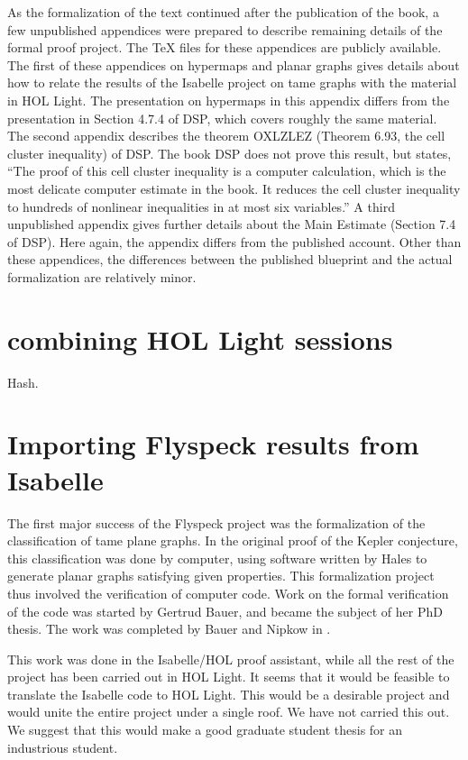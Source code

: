 As the formalization of the text continued after the publication of the book, a few unpublished appendices were prepared
to describe remaining details of the formal proof project.  The TeX files for these appendices are publicly available.
The first of these appendices on hypermaps and planar graphs
gives details about how to relate the results of the Isabelle project on tame graphs with the material in HOL Light.
The presentation on hypermaps in this appendix differs from the presentation in Section 4.7.4 of DSP, which covers
roughly the same material.  
The second appendix describes the theorem OXLZLEZ (Theorem 6.93, the cell cluster inequality) of DSP.   The book DSP
does not prove this result, but states, ``The proof of this cell cluster inequality is a computer calculation, which is the most
delicate computer estimate in the book.  It reduces the cell cluster inequality to hundreds of nonlinear inequalities in at most
six variables.''    A third unpublished appendix gives further details about the Main Estimate (Section 7.4 of DSP).  Here again,
the appendix differs from the published account.  Other than these appendices, the differences between the published blueprint
and the actual formalization are relatively minor.




\section{combining HOL Light sessions}

Hash.


\section{Importing Flyspeck results from Isabelle}

The first major success of the Flyspeck project was the formalization of the classification of tame plane graphs.
In the original proof of the Kepler conjecture, this classification was done by computer, using software written by Hales
to generate planar graphs satisfying given properties.   This formalization project
thus involved the verification of computer code.  Work on the formal verification of the code was started by Gertrud Bauer,
and became the subject of her PhD thesis.  The work was completed by Bauer and Nipkow in \cite{XX}.

This work was done in the Isabelle/HOL proof assistant, while all the rest of the project has been carried out in HOL Light.
It seems that it would be feasible to translate the Isabelle code to HOL Light.  This would be a desirable project and would
unite the entire project under a single roof.  We have not carried this out.   We suggest that this would make a good graduate
student thesis for an industrious student.

